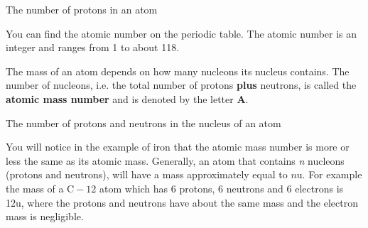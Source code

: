  { \label{m38745*meaningfhsst!!!underscore!!!id284}
      \label{m38745*id255833}The number of protons in an atom \par 
       } 
      
\label{m38745*eip-164}You can find the atomic number on the periodic table. The atomic number is an integer and ranges from 1 to about 118.\par \label{m38745*id255845}The mass of an atom depends on how many nucleons its nucleus contains.
The number of nucleons, i.e. the total number of protons \textbf{plus} neutrons,
is called the
\textbf{atomic mass number} and is denoted by the letter \textbf{A}.\par 

 { \label{m38745*meaningfhsst!!!underscore!!!id291}
      \label{m38745*id255874}The number of protons and neutrons in the nucleus of an atom \par 
       } 

      

\label{m38745*id256193}You will notice in the example of iron that the atomic mass number is more or less the same as its atomic mass. Generally, an atom that contains \textsl{n} nucleons (protons and neutrons), will have a mass approximately equal to $n$u. For example the mass of a $\mathrm{C}-12$ atom which has 6 protons, 6 neutrons and 6 electrons is 12u, where the protons and neutrons have about the same mass and the electron mass is negligible. \par \pagebreak
\label{m38745*eip-950}\vspace{.5cm} 
      \noindent

